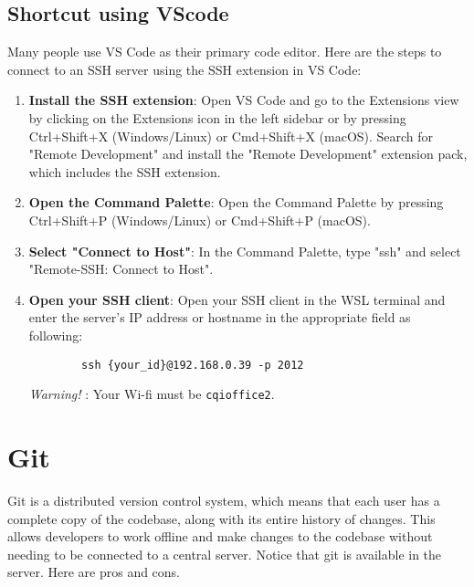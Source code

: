 \documentclass[10pt, a4paper]{article}
\begin{document}
\subsection*{Shortcut using VScode}
Many people use VS Code as their primary code editor. Here are the steps to connect to an SSH server using the SSH extension in VS Code:
\begin{enumerate}
    \item \textbf{Install the SSH extension}:
    Open VS Code and go to the Extensions view by clicking on the Extensions icon in the left sidebar or by pressing Ctrl+Shift+X (Windows/Linux) or Cmd+Shift+X (macOS). Search for "Remote Development" and install the "Remote Development" extension pack, which includes the SSH extension.
    \item \textbf{Open the Command Palette}:
    Open the Command Palette by pressing Ctrl+Shift+P (Windows/Linux) or Cmd+Shift+P (macOS).
    \item \textbf{Select "Connect to Host"}:
    In the Command Palette, type "ssh" and select "Remote-SSH: Connect to Host".
    \item \textbf{Open your SSH client}: Open your SSH client in the WSL terminal and enter the server's IP address or hostname in the appropriate field as following:
    \begin{lstlisting}
        ssh {your_id}@192.168.0.39 -p 2012
    \end{lstlisting}
    \textit{Warning!} : Your Wi-fi must be \texttt{cqioffice2}.
\end{enumerate}

\newpage

\section*{Git}
Git is a distributed version control system, which means that each user has a complete copy of the codebase, along with its entire history of changes. 
This allows developers to work offline and make changes to the codebase without needing to be connected to a central server. Notice that git is available in the server.
Here are pros and cons.
\end{document}
